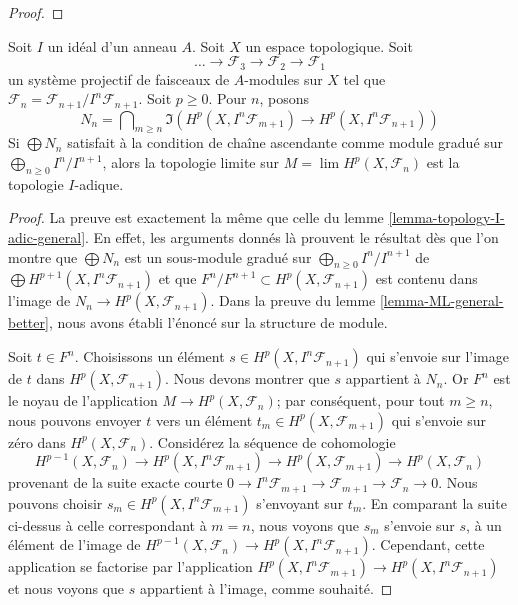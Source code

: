 {\begin{proof}
\end{proof}

\begin{lemma}

\label{lemma-topology-I-adic-general-better}
Soit $I$ un idéal d'un anneau $A$. Soit $X$ un espace topologique. Soit $$
\ldots \to \mathcal{F}_3 \to \mathcal{F}_2 \to \mathcal{F}_1
$$ un système projectif de faisceaux de $A$-modules sur $X$ tel que $\mathcal{F}_n = \mathcal{F}_{n + 1}/I^n\mathcal{F}_{n + 1}$. Soit $p \geq 0$. Pour $n$, posons $$
N_n =
\bigcap\nolimits_{m \geq n}
\Im\left(
H^p(X, I^n\mathcal{F}_{m + 1}) \to H^p(X, I^n\mathcal{F}_{n + 1})
\right)
$$ Si $\bigoplus N_n$ satisfait à la condition de chaîne ascendante comme module gradué sur $\bigoplus_{n \geq 0} I^n/I^{n + 1}$, alors la topologie limite sur $M = \lim H^p(X, \mathcal{F}_n)$ est la topologie $I$-adique.
\end{lemma}

\begin{proof}
La preuve est exactement la même que celle du lemme \ref{lemma-topology-I-adic-general}. En effet, les arguments donnés là prouvent le résultat dès que l'on montre que $\bigoplus N_n$ est un sous-module gradué sur $\bigoplus_{n \geq 0} I^n/I^{n + 1}$ de $\bigoplus H^{p + 1}(X, I^n\mathcal{F}_{n + 1})$ et que $F^n/F^{n + 1} \subset H^p(X, \mathcal{F}_{n + 1})$ est contenu dans l'image de $N_n \to H^p(X, \mathcal{F}_{n + 1})$. Dans la preuve du lemme \ref{lemma-ML-general-better}, nous avons établi l'énoncé sur la structure de module.

\medskip\noindent

Soit $t \in F^n$. Choisissons un élément $s \in H^p(X, I^n\mathcal{F}_{n + 1})$
qui s'envoie sur l'image de $t$ dans $H^p(X, \mathcal{F}_{n + 1})$. Nous devons montrer que $s$ appartient à $N_n$. Or $F^n$ est le noyau de l'application
$M \to H^p(X, \mathcal{F}_n)$; par conséquent, pour tout $m \geq n$, nous pouvons envoyer $t$
vers un élément $t_m \in H^p(X, \mathcal{F}_{m + 1})$ qui s'envoie sur zéro dans $H^p(X, \mathcal{F}_n)$. Considérez la séquence de cohomologie
$$
H^{p - 1}(X, \mathcal{F}_n) \to
H^p(X, I^n\mathcal{F}_{m + 1}) \to
H^p(X, \mathcal{F}_{m + 1}) \to
H^p(X, \mathcal{F}_n)
$$
provenant de la suite exacte courte
$0 \to I^n\mathcal{F}_{m + 1} \to \mathcal{F}_{m + 1} \to \mathcal{F}_n \to 0$. Nous pouvons choisir $s_m \in H^p(X, I^n\mathcal{F}_{m + 1})$ s'envoyant sur $t_m$. En comparant la suite ci-dessus à celle correspondant à $m = n$, nous voyons que
$s_m$ s'envoie sur $s$, à un élément de l'image de
$H^{p - 1}(X, \mathcal{F}_n) \to H^p(X, I^n\mathcal{F}_{n + 1})$. Cependant, cette application se factorise par l'application
$H^p(X, I^n\mathcal{F}_{m + 1}) \to H^p(X, I^n\mathcal{F}_{n + 1})$
et nous voyons que $s$ appartient à l'image, comme souhaité.


\end{proof}}
